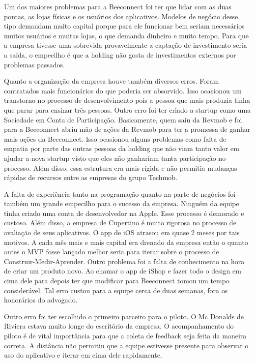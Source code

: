Um dos maiores problemas para a Beeconnect foi ter que lidar com as duas pontas, as lojas físicas e os usuários dos aplicativos. Modelos de negócio desse tipo demandam muito capital porque para ele funcionar bem seriam necessários muitos usuários e muitas lojas, o que demanda dinheiro e muito tempo. Para que a empresa tivesse uma sobrevida provavelmente a captação de investimento seria a saída, o empecilho é que a holding não gosta de investimentos externos por problemas passados.

Quanto a organização da empresa houve também diversos erros. Foram contratados mais funcionários do que poderia ser absorvido. Isso ocasionou um transtorno no processo de desenvolvimento pois a pessoa que mais produzia tinha que parar para ensinar três pessoas. Outro erro foi ter criado a startup como uma Sociedade em Conta de Participação. Basicamente, quem saiu da Revmob e foi para a Beeconnect abriu mão de ações da Revmob para ter a promessa de ganhar mais ações da Beeconnect. Isso ocasionou alguns problemas como falta de empatia por parte das outras pessoas da holding que não viam tanto valor em ajudar a nova startup visto que eles não ganhariam tanta participação no processo. Além disso, essa estrutura era mais rígida e não permitia mudanças rápidas de recursos entre as empresas do grupo Techmob.

A falta de experiência tanto na programação quanto na parte de negócios foi também um grande empecilho para o sucesso da empresa. Ninguém da equipe tinha criado uma conta de desenvolvedor na Apple. Esse processo é demorado e custoso. Além disso, a empresa de Cupertino é muito rigorosa no processo de avaliação de seus aplicativos. O app de iOS atrasou em quase 2 meses por tais motivos. A cada mês mais e mais capital era drenado da empresa então o quanto antes o MVP fosse lançado melhor seria para iterar sobre o processo de Construir-Medir-Aprender. Outro problema foi a falta de conhecimento na hora de criar um produto novo. Ao chamar o app de iShop e fazer todo o design em cima dele para depois ter que modificar para Beeconnect tomou um tempo considerável. Tal erro custou para a equipe cerca de duas semanas, fora os honorários do advogado.

Outro erro foi ter escolhido o primeiro parceiro para o piloto. O Mc Donalds de Riviera estava muito longe do escritório da empresa. O acompanhamento do piloto é de vital importância para que a coleta de feedback seja feita da maneira correta. A distância não permitiu que a equipe estivesse presente para observar o uso do aplicativo e iterar em cima dele rapidamente.

